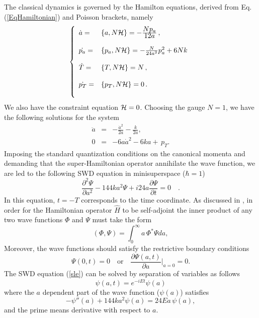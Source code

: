 The classical dynamics is governed by the Hamilton equations, derived from Eq. (\ref{EqHamiltonian}) and Poisson brackets, namely
\begin{equation}
\left\{
\begin{array}{llllll}
\dot{a} =&\{a,N{\cal H}\}=-\frac{\displaystyle Np_{a}}{\displaystyle 12a}\, ,\\
 & \\
\dot{p_{a}} =&\{p_{a},N{\cal H}\}=- \frac{N}{24a^2}p_a^2+6Nk  \\
& \\
\dot{T} =&\{T,N{\cal H}\}=N\, ,\\
 & \\
\dot{p_{T}} =&\{p_{T},N{\cal H}\}=0\, .\\
& \\
\end{array}
\right. \label{4}
\end{equation}
We also have the constraint equation ${\cal H} = 0$. Choosing the
gauge $N=1$, we have the following solutions for the system
\begin{eqnarray}
\ddot{a}&=&-\frac{\dot a^2}{2a}-\frac{k}{2a},\\
0&=&-6a\dot a^2-6k a+\,p_T.
\end{eqnarray}
Imposing the standard quantization conditions on the canonical
momenta and demanding that the super-Hamiltonian operator annihilate
the wave function, we are led to the following SWD equation in
minisuperspace ($\hbar =1$)
\begin{equation}
\label{sle} \frac{\partial^2\Psi}{\partial a^2} - 144ka^2\Psi + i24a\frac{\partial\Psi}{\partial t} = 0 \quad .
\end{equation}
In this equation, $t=-T$ corresponds to the time coordinate. As discussed in \cite{nivaldo,15}, in order for  the Hamiltonian operator ${\hat H}$ to
be self-adjoint  the inner product of any two wave functions $\Phi$ and $\Psi$ must take the form
\begin{equation}
(\Phi,\Psi) = \int_0^\infty a\,\Phi^*\Psi da,
\end{equation}
Moreover,  the wave functions should satisfy the restrictive boundary conditions
\begin{equation}
\label{boundary} \Psi(0,t) = 0 \quad \mbox{or} \quad \frac{\partial\Psi (a,t)}{\partial a}\bigg\vert_{a = 0} = 0.
\end{equation}
The SWD equation (\ref{sle}) can  be solved by separation of
variables as follows
\begin{equation}
\psi(a,t) = e^{-iEt}\psi(a) \label{11}
\end{equation}
where the $a$ dependent part of the wave function ($\psi(a)$) satisfies
\begin{equation}
\label{sle2} -\psi''(a) +144 ka^2\psi(a) =24Ea\,\psi(a),
\end{equation}
and the prime means derivative with respect to $a$.


